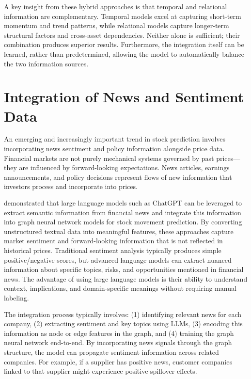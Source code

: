 A key insight from these hybrid approaches is that temporal and relational information are complementary. Temporal models excel at capturing short-term momentum and trend patterns, while relational models capture longer-term structural factors and cross-asset dependencies. Neither alone is sufficient; their combination produces superior results. Furthermore, the integration itself can be learned, rather than predetermined, allowing the model to automatically balance the two information sources.

\section{Integration of News and Sentiment Data}

An emerging and increasingly important trend in stock prediction involves incorporating news sentiment and policy information alongside price data. Financial markets are not purely mechanical systems governed by past prices—they are influenced by forward-looking expectations. News articles, earnings announcements, and policy decisions represent flows of new information that investors process and incorporate into prices.

\cite{Chen_2023} demonstrated that large language models such as ChatGPT can be leveraged to extract semantic information from financial news and integrate this information into graph neural network models for stock movement prediction. By converting unstructured textual data into meaningful features, these approaches capture market sentiment and forward-looking information that is not reflected in historical prices. Traditional sentiment analysis typically produces simple positive/negative scores, but advanced language models can extract nuanced information about specific topics, risks, and opportunities mentioned in financial news. The advantage of using large language models is their ability to understand context, implications, and domain-specific meanings without requiring manual labeling.

The integration process typically involves: (1) identifying relevant news for each company, (2) extracting sentiment and key topics using LLMs, (3) encoding this information as node or edge features in the graph, and (4) training the graph neural network end-to-end. By incorporating news signals through the graph structure, the model can propagate sentiment information across related companies. For example, if a supplier has positive news, customer companies linked to that supplier might experience positive spillover effects.

